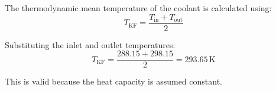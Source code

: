 The thermodynamic mean temperature of the coolant is calculated using:  
\[
T_{\text{KF}} = \frac{T_{\text{in}} + T_{\text{out}}}{2}
\]  

Substituting the inlet and outlet temperatures:  
\[
T_{\text{KF}} = \frac{288.15 + 298.15}{2} = 293.65 \, \text{K}
\]  

This is valid because the heat capacity is assumed constant.